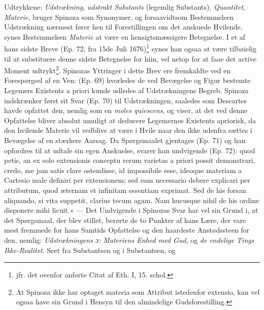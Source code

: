 \documentclass[12pt,a4paper]{book}
\newcommand{\opage}[1]{\marginnote{\footnotesize\textit{[#1]}}}
\begin{document}
Udtrykkene: \emph{Udstrækning}, \emph{udstrakt Substants} (legemlig
Substants), \emph{Quantitet}, \emph{Materie}, bruger Spinoza som
Synonymer, og forsaavidtsom Bestemmelsen Udstrækning nærmest
fører hen til Forestillingen om det anskuede Hvilende, synes
Bestemmelsen \emph{Materie} at være en hensigtsmæssigere Betegnelse. I
et af hans sidste Breve (Ep. 72, fra 15de Juli 1676)\footnote{jfr.
det ovenfor anførte Citat af Eth. I, 15. schol.} synes han ogsaa
at være tilbøielig til at substituere denne sidste Betegnelse for
hiin, vel netop for at faae det active Moment
udtrykt\footnote{At Spinoza ikke har optaget materia som Attribut
istedenfor extensio, kan vel ogsaa have sin Grund i Hensyn til
den almindelige Gudsforestilling.}. Spinozas Yttringer
\opage{77} \setcounter{footnote}{0}%
i dette Brev ere fremkaldte ved en Forespørgsel af en Ven: (Ep.
69) hvorledes de ved Bevægelse og Figur bestemte Legemers
Existents a priori kunde udledes af Udstrækningens Begreb.
Spinoza indskrænker først sit Svar (Ep. 70) til Udstrækningen,
saaledes som Descartes havde opfattet den, nemlig som en \emph{moles
quiescens}, og viser, at det ved denne Opfattelse bliver absolut
umuligt at deducere Legemernes Existents apriorisk, da den
hvilende Materie vil vedblive at være i Hvile naar den ikke
udenfra sættes i Bevægelse af en stærkere Aarsag. Da
Spørgsmaalet gjentages (Ep. 71) og han opfordres til at udtale
sin egen Anskuelse, svarer han undvigende (Ep. 72):
quod petis,
an ex solo extensionis conceptu rerum varietas a priori possit
demonstrari, credo, me jam satis clare ostendisse, id impossibile
esse, ideoque materiam a Cartesio male definiri per extensionem;
sed eam necessario debere explicari per attributum, quod æternam
et infinitam essentiam exprimat. Sed de his forsan aliquando, si
vita suppetit, clarius tecum agam. Nam hucusque nihil de his
ordine disponere mihi licuit.« --- Det Undvigende i Spinozas Svar
har vel sin Grund i, at det Spørgsmaal, der blev stillet, berørte
de to Punkter af hans Lære, der vare mest fremmede for hans
Samtids Opfattelse og den haardeste Anstødssteen for den, nemlig:
\emph{Udstrækningens ɔ: Materiens Enhed med Gud}, og \emph{de endelige
Tings Ikke-Realitet}. Seet fra Substantsen og i Substantsen, og
\end{document}
